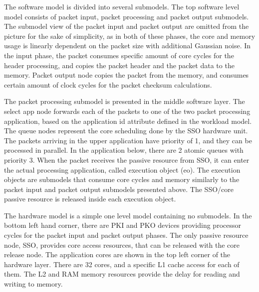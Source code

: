 
The software model is divided into several submodels. The top software level model consists of packet input, packet processing and packet output submodels. The submodel view of the packet input and packet output are omitted from the picture for the sake of simplicity, as in both of these phases, the core and memory usage is linearly dependent on the packet size with additional Gaussian noise. In the input phase, the packet consumes specific amount of core cycles for the header processing, and copies the packet header and the packet data to the memory. Packet output node copies the packet from the memory, and consumes certain amount of clock cycles for the packet checksum calculations.

The packet processing submodel is presented in the middle software layer. The select app node forwards each of the packets to one of the two packet processing application, based on the application id attribute defined in the workload model. The queue nodes represent the core scheduling done by the SSO hardware unit. The packets arriving in the upper application have priority of 1, and they can be processed in parallel. In the application below, there are 2 atomic queues with priority 3. When the packet receives the passive resource from SSO, it can enter the actual processing application, called execution object (eo). The execution objects are submodels that consume core cycles and memory similarly to the packet input and packet output submodels presented above. The SSO/core passive resource is released inside each execution object.

The hardware model is a simple one level model containing no submodels. In the bottom left hand corner, there are PKI and PKO devices providing processor cycles for the packet input and packet output phases. The only passive resource node, SSO, provides core access resources, that can be released with the core release node. The application cores are shown in the top left corner of the hardware layer. There are 32 cores, and a specific L1 cache access for each of them. The L2 and RAM memory resources provide the delay for reading and writing to memory.


